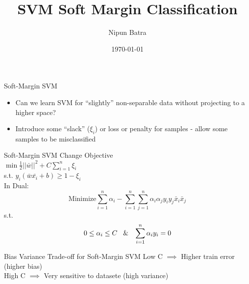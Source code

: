 \documentclass{beamer}
\title{SVM Soft Margin Classification}
\date{\today}
\author{Nipun Batra}
\institute{IIT Gandhinagar}
\begin{document}
	\maketitle
	
{
	
}

	
	\begin{frame}{Soft-Margin SVM}
	\begin{itemize}[<+->]
		\item Can we learn SVM for ``slightly'' non-separable data without projecting to a higher space? 
		\item Introduce some ``slack'' ($\xi_i$) or loss or penalty for samples - allow some samples to be misclassified
		
	\end{itemize}
		
		
		
	\end{frame}

{
	
}
	
	\begin{frame}{Soft-Margin SVM}
		Change Objective \\
		\vspace{0.1cm}
		$\min \frac{1}{2}\lvert\lvert\bar{w}\rvert\rvert^{2} + C \sum_{i=1}^{n}\xi_{i}$ \\ s.t. $y_{i}(\bar{w}\bar{x_i} + b) \geq 1 - \xi_{i}$ \\
		
		\vspace{0.2cm}
		\pause In Dual:
		$$\text{Minimize} \sum_{i=1}^{n}\alpha_{i} - \sum_{i=1}^{n}\sum_{j=1}^{n}\alpha_{i}\alpha_{j}y_{i}y_{j}\bar{x}_{i}\bar{x}_{j}$$
		s.t.
		$$0 \leq \alpha_{i} \leq C \text{\hspace{0.3cm}\&\hspace{0.3cm}} \sum_{i=1}^{n}\alpha_{i}y_{i} = 0$$
		
	\end{frame}


{
	
}

\begin{frame}{Bias Variance Trade-off for Soft-Margin SVM}
	Low C $\implies$ Higher train error (higher bias) \\
	\vspace{1cm}
	High C $\implies$ Very sensitive to datasete (high variance) \\
\end{frame}
\end{document}
